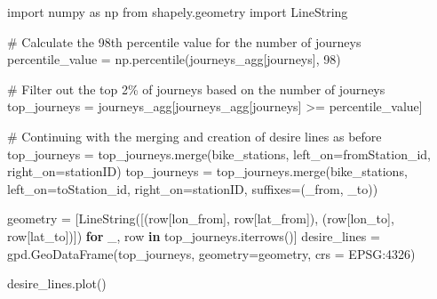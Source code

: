 \documentclass[
  letterpaper,
  DIV=11,
  numbers=noendperiod]{scrreprt}
\newenvironment{Shaded}{\begin{snugshade}}{\end{snugshade}}
\newcommand{\CommentTok}[1]{\textcolor[rgb]{0.37,0.37,0.37}{#1}}
\newcommand{\ControlFlowTok}[1]{\textcolor[rgb]{0.00,0.23,0.31}{\textbf{#1}}}
\newcommand{\DecValTok}[1]{\textcolor[rgb]{0.68,0.00,0.00}{#1}}
\newcommand{\ImportTok}[1]{\textcolor[rgb]{0.00,0.46,0.62}{#1}}
\newcommand{\KeywordTok}[1]{\textcolor[rgb]{0.00,0.23,0.31}{\textbf{#1}}}
\newcommand{\NormalTok}[1]{\textcolor[rgb]{0.00,0.23,0.31}{#1}}
\newcommand{\OperatorTok}[1]{\textcolor[rgb]{0.37,0.37,0.37}{#1}}
\newcommand{\StringTok}[1]{\textcolor[rgb]{0.13,0.47,0.30}{#1}}
\begin{document}
\begin{Shaded}
\begin{Highlighting}[]
\ImportTok{import}\NormalTok{ numpy }\ImportTok{as}\NormalTok{ np}
\ImportTok{from}\NormalTok{ shapely.geometry }\ImportTok{import}\NormalTok{ LineString}

\CommentTok{\# Calculate the 98th percentile value for the number of journeys}
\NormalTok{percentile\_value }\OperatorTok{=}\NormalTok{ np.percentile(journeys\_agg[}\StringTok{\textquotesingle{}journeys\textquotesingle{}}\NormalTok{], }\DecValTok{98}\NormalTok{)}

\CommentTok{\# Filter out the top 2\% of journeys based on the number of journeys}
\NormalTok{top\_journeys }\OperatorTok{=}\NormalTok{ journeys\_agg[journeys\_agg[}\StringTok{\textquotesingle{}journeys\textquotesingle{}}\NormalTok{] }\OperatorTok{\textgreater{}=}\NormalTok{ percentile\_value]}

\CommentTok{\# Continuing with the merging and creation of desire lines as before}
\NormalTok{top\_journeys }\OperatorTok{=}\NormalTok{ top\_journeys.merge(bike\_stations, left\_on}\OperatorTok{=}\StringTok{\textquotesingle{}fromStation\_id\textquotesingle{}}\NormalTok{, right\_on}\OperatorTok{=}\StringTok{\textquotesingle{}stationID\textquotesingle{}}\NormalTok{)}
\NormalTok{top\_journeys }\OperatorTok{=}\NormalTok{ top\_journeys.merge(bike\_stations, left\_on}\OperatorTok{=}\StringTok{\textquotesingle{}toStation\_id\textquotesingle{}}\NormalTok{, right\_on}\OperatorTok{=}\StringTok{\textquotesingle{}stationID\textquotesingle{}}\NormalTok{, suffixes}\OperatorTok{=}\NormalTok{(}\StringTok{\textquotesingle{}\_from\textquotesingle{}}\NormalTok{, }\StringTok{\textquotesingle{}\_to\textquotesingle{}}\NormalTok{))}

\NormalTok{geometry }\OperatorTok{=}\NormalTok{ [LineString([(row[}\StringTok{\textquotesingle{}lon\_from\textquotesingle{}}\NormalTok{], row[}\StringTok{\textquotesingle{}lat\_from\textquotesingle{}}\NormalTok{]), (row[}\StringTok{\textquotesingle{}lon\_to\textquotesingle{}}\NormalTok{], row[}\StringTok{\textquotesingle{}lat\_to\textquotesingle{}}\NormalTok{])]) }\ControlFlowTok{for}\NormalTok{ \_, row }\KeywordTok{in}\NormalTok{ top\_journeys.iterrows()]}
\NormalTok{desire\_lines }\OperatorTok{=}\NormalTok{ gpd.GeoDataFrame(top\_journeys, geometry}\OperatorTok{=}\NormalTok{geometry, crs }\OperatorTok{=} \StringTok{\textquotesingle{}EPSG:4326\textquotesingle{}}\NormalTok{)}

\NormalTok{desire\_lines.plot()}
\end{Highlighting}
\end{Shaded}
\end{document}
